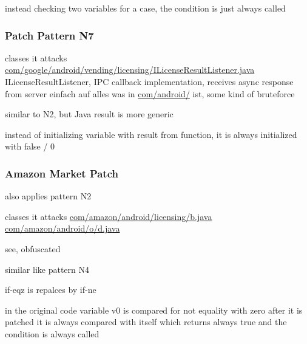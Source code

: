 

instead checking two variables for a case, the condition is just always called
\subsubsection{Patch Pattern N7}
classes it attacks %
\url{com/google/android/vending/licensing/ILicenseResultListener.java}
ILicenseResultListener, IPC callback implementation, receives async response from server\cite{developersLicensingReference}
einfach auf alles was in \url{com/android/} ist, some kind of bruteforce

similar to N2, but Java result is more generic



instead of initializing variable with result from function, it is always initialized with false / 0
\subsubsection{Amazon Market Patch}
also applies pattern N2

classes it attacks %
\url{com/amazon/android/licensing/b.java}
\url{com/amazon/android/o/d.java}

see, obfuscated

similar like pattern N4



if-eqz is repalces by if-ne


in the original code variable v0 is compared for not equality with zero
after it is patched it is always compared with itself which returns always true and the condition is always called

